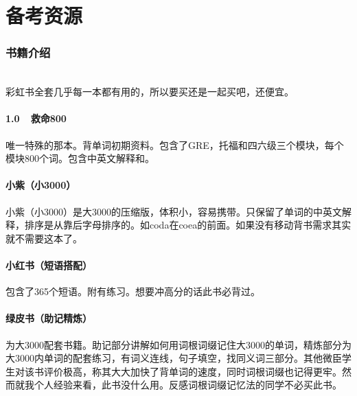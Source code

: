 \documentclass[11pt,a4paper]{article}
\begin{document}
	\par\vspace{44pt}{\Large\bfseries\sffamily\textcolor{red}
	{当然了，本文仅供参考。很多时候，自己闯出一些路，自己吃了亏，才是收获最大的。所以也不要只按本文所述，要探索适合自己的方式，会有意想不到的收获。}}
	\newpage
	
	\part{备考资源}
	\section{书籍介绍}{
	\\ 
	彩虹书全套几乎每一本都有用的，所以要买还是一起买吧，还便宜。
	
	\subsection*{1.0~~救命800}
	唯一特殊的那本。背单词初期资料。包含了GRE，托福和四六级三个模块，每个模块800个词。包含中英文解释和。
	
	\subsection{小紫（小3000）}小紫（小3000）是大3000的压缩版，体积小，容易携带。只保留了单词的中英文解释，排序是从靠后字母排序的。如coda在coea的前面。如果没有移动背书需求其实就不需要这本了。
	
	\subsection{小红书（短语搭配）}包含了365个短语。附有练习。想要冲高分的话此书必背过。
	
	\subsection{绿皮书（助记精炼）}为大3000配套书籍。助记部分讲解如何用词根词缀记住大3000的单词，精炼部分为大3000内单词的配套练习，有词义连线，句子填空，找同义词三部分。其他微臣学生对该书评价极高，称其大大加快了背单词的速度，同时词根词缀也记得更牢。然而就我个人经验来看，此书没什么用。反感词根词缀记忆法的同学不必买此书。
	
}
\end{document}
